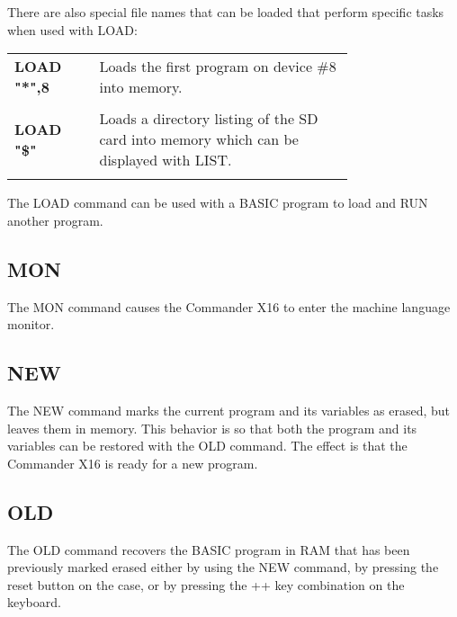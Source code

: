 There are also special file names that can be loaded that perform specific
tasks when used with {\ttfamily LOAD}:\\

\begin{tabular}{l p{0.75\linewidth}}

	{\ttfamily\bfseries LOAD "*",8}&Loads the first program on device \#8 into
	memory.\\\\

	{\ttfamily\bfseries LOAD "\$"}&Loads a directory listing of the SD card
	into memory which can be displayed with {\ttfamily LIST}.\\\\

\end{tabular}

\vspace{16pt}

The {\ttfamily LOAD} command can be used with a BASIC program to load and
{\ttfamily RUN} another program.\\

\subsection{MON}

The {\ttfamily MON} command causes the Commander X16 to enter the machine
language monitor.\\

\subsection{NEW} 

The {\ttfamily NEW} command marks the current program and its variables as
erased, but leaves them in memory.  This behavior is so that both the program
and its variables can be restored with the {\ttfamily OLD} command.  The effect
is that the Commander X16 is ready for a new program.\\

\subsection{OLD}

 The {\ttfamily OLD} command recovers the BASIC program in RAM that has been
 previously marked erased either by using the {\ttfamily NEW} command, by
 pressing the reset button on the case, or by pressing the
 ++
 key combination on the keyboard.\\

